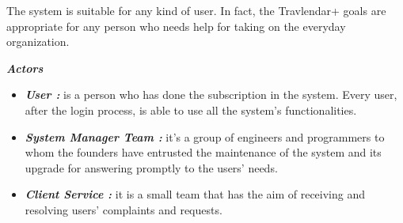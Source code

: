 The system is suitable for any kind of user. In fact, the Travlendar+ goals are appropriate for any person who needs help for taking on the everyday organization.\\
\par
\emph{\textbf{Actors}}
\begin{itemize}
	\setlength{\leftskip}{1cm}
	\item \emph{\textbf{User : }}is a person who has done the subscription in the system. Every user, after the login process, is able to use all the system’s functionalities.

	\item \emph{\textbf{System Manager Team : }}it’s a group of engineers and programmers to whom the founders have entrusted the maintenance of the system and its upgrade for answering promptly to the users’ needs.

	\item \emph{\textbf{Client Service : }}it is a small team that has the aim of receiving and resolving users’ complaints and requests.
\end{itemize}

